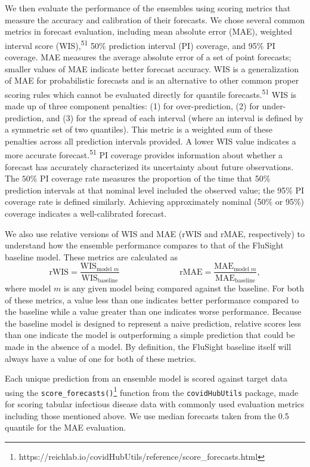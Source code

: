 \documentclass[
]{article}
\begin{document}
We then evaluate the performance of the ensembles using scoring metrics
that measure the accuracy and calibration of their forecasts. We chose
several common metrics in forecast evaluation, including mean absolute
error (MAE), weighted interval score (WIS),\textsuperscript{51} 50\%
prediction interval (PI) coverage, and 95\% PI coverage. MAE measures
the average absolute error of a set of point forecasts; smaller values
of MAE indicate better forecast accuracy. WIS is a generalization of MAE
for probabilistic forecasts and is an alternative to other common proper
scoring rules which cannot be evaluated directly for quantile
forecasts.\textsuperscript{51} WIS is made up of three component
penalties: (1) for over-prediction, (2) for under-prediction, and (3)
for the spread of each interval (where an interval is defined by a
symmetric set of two quantiles). This metric is a weighted sum of these
penalties across all prediction intervals provided. A lower WIS value
indicates a more accurate forecast.\textsuperscript{51} PI coverage
provides information about whether a forecast has accurately
characterized its uncertainty about future observations. The \(50\)\% PI
coverage rate measures the proportion of the time that 50\% prediction
intervals at that nominal level included the observed value; the 95\% PI
coverage rate is defined similarly. Achieving approximately nominal
(50\% or 95\%) coverage indicates a well-calibrated forecast.

We also use relative versions of WIS and MAE (rWIS and rMAE,
respectively) to understand how the ensemble performance compares to
that of the FluSight baseline model. These metrics are calculated as
\[\textrm{rWIS} = \frac{\textrm{WIS}_{\textrm{model }m}}{\textrm{WIS}_{\textrm{baseline}}} \hspace{3cm} \textrm{rMAE} = \frac{\textrm{MAE}_{\textrm{model }m}}{\textrm{MAE}_{\textrm{baseline}}},\]where
model \(m\) is any given model being compared against the baseline. For
both of these metrics, a value less than one indicates better
performance compared to the baseline while a value greater than one
indicates worse performance. Because the baseline model is designed to
represent a naive prediction, relative scores less than one indicate the
model is outperforming a simple prediction that could be made in the
absence of a model. By definition, the FluSight baseline itself will
always have a value of one for both of these metrics.

Each unique prediction from an ensemble model is scored against target
data using the \texttt{score\_forecasts()}\footnote{https://reichlab.io/covidHubUtils/reference/score\_forecasts.html}
function from the \texttt{covidHubUtils} package, made for scoring
tabular infectious disease data with commonly used evaluation metrics
including those mentioned above. We use median forecasts taken from the
0.5 quantile for the MAE evaluation.
\end{document}
